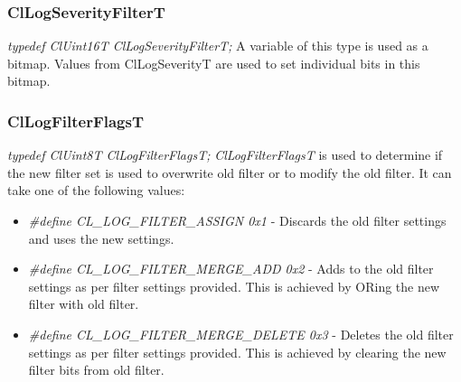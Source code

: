 \begin{flushleft}
\subsubsection{ClLogSeverityFilterT}
\textit{typedef ClUint16T ClLogSeverityFilterT;}
\newline
\newline
A variable of this type is used as a bitmap. Values from ClLogSeverityT are used to set individual bits in this bitmap.




\subsubsection{ClLogFilterFlagsT}
\textit{typedef ClUint8T ClLogFilterFlagsT;}
\newline
\newline
\textit{ClLogFilterFlagsT} is used to determine if the new filter set is used to overwrite old filter or to
modify the old filter. It can take one of the following values:
\begin{itemize}
\item
\textit{\#define CL\_\-LOG\_\-FILTER\_\-ASSIGN 0x1} - Discards the old filter settings and uses the new settings.
\item
\textit{\#define CL\_\-LOG\_\-FILTER\_\-MERGE\_\-ADD	0x2} - Adds to the old filter settings as per filter settings provided. This is achieved by ORing 
the new filter with old filter.
\item
\textit{\#define CL\_\-LOG\_\-FILTER\_\-MERGE\_\-DELETE 0x3} - Deletes the old filter settings as per filter settings provided. This is achieved by 
clearing the 
new filter bits from old filter.
\end{itemize}	



\end{flushleft}
